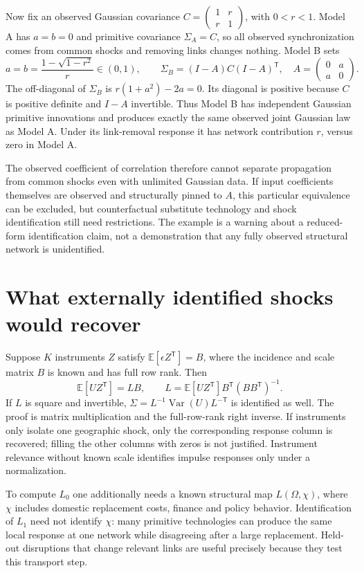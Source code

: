 \documentclass[11pt]{article}
\begin{document}
Now fix an observed Gaussian covariance $C=\begin{pmatrix}1&r\\r&1\end{pmatrix}$, with $0<r<1$. Model A has $a=b=0$ and primitive covariance $\Sigma_A=C$, so all observed synchronization comes from common shocks and removing links changes nothing. Model B sets
\[
 a=b=\frac{1-\sqrt{1-r^2}}r\in(0,1),\qquad
 \Sigma_B=(I-A)C(I-A)^{\mathsf T},
 \quad A=\begin{pmatrix}0&a\\a&0\end{pmatrix}.
\]
The off-diagonal of $\Sigma_B$ is $r(1+a^2)-2a=0$. Its diagonal is positive because $C$ is positive definite and $I-A$ invertible. Thus Model B has independent Gaussian primitive innovations and produces exactly the same observed joint Gaussian law as Model A. Under its link-removal response it has network contribution $r$, versus zero in Model A.

The observed coefficient of correlation therefore cannot separate propagation from common shocks even with unlimited Gaussian data. If input coefficients themselves are observed and structurally pinned to $A$, this particular equivalence can be excluded, but counterfactual substitute technology and shock identification still need restrictions. The example is a warning about a reduced-form identification claim, not a demonstration that any fully observed structural network is unidentified.

\section{What externally identified shocks would recover}
Suppose $K$ instruments $Z$ satisfy $\mathbb E[\epsilon Z^{\mathsf T}]=B$, where the incidence and scale matrix $B$ is known and has full row rank. Then
\[
 \mathbb E[UZ^{\mathsf T}]=LB,
 \qquad L=\mathbb E[UZ^{\mathsf T}]B^{\mathsf T}(BB^{\mathsf T})^{-1}.
\]
If $L$ is square and invertible, $\Sigma=L^{-1}\operatorname{Var}(U)L^{-\mathsf T}$ is identified as well. The proof is matrix multiplication and the full-row-rank right inverse. If instruments only isolate one geographic shock, only the corresponding response column is recovered; filling the other columns with zeros is not justified. Instrument relevance without known scale identifies impulse responses only under a normalization.

To compute $L_0$ one additionally needs a known structural map $L(\Omega,\chi)$, where $\chi$ includes domestic replacement costs, finance and policy behavior. Identification of $L_1$ need not identify $\chi$: many primitive technologies can produce the same local response at one network while disagreeing after a large replacement. Held-out disruptions that change relevant links are useful precisely because they test this transport step.
\end{document}
